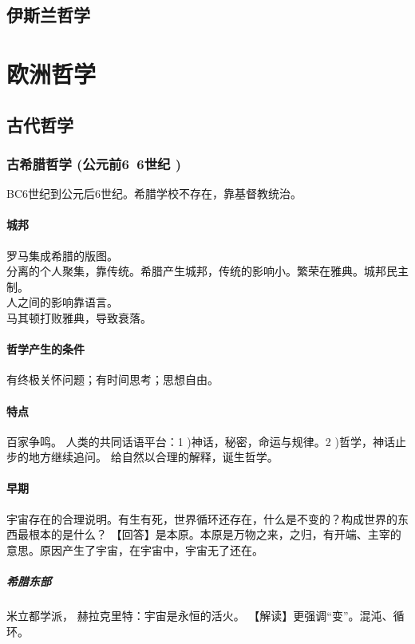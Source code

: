 \documentclass[UTF8]{../RepresentationUniverse}
\begin{document}
\subsection{伊斯兰哲学}




\section{欧洲哲学}
\subsection{古代哲学}
    \subsubsection{古希腊哲学 (公元前6~6世纪 )}
    BC6世纪到公元后6世纪。希腊学校不存在，靠基督教统治。

    \paragraph{城邦}
    罗马集成希腊的版图。\\
    分离的个人聚集，靠传统。希腊产生城邦，传统的影响小。繁荣在雅典。城邦民主制。\\
    人之间的影响靠语言。\\
    马其顿打败雅典，导致衰落。\\


    \paragraph{哲学产生的条件}
    有终极关怀问题；有时间思考；思想自由。

    \paragraph{特点}
    百家争鸣。
    人类的共同话语平台：1 )神话，秘密，命运与规律。2 )哲学，神话止步的地方继续追问。
    给自然以合理的解释，诞生哲学。


    \paragraph{早期}
    宇宙存在的合理说明。有生有死，世界循环还存在，什么是不变的？构成世界的东西最根本的是什么？
    【回答】是本原。本原是万物之来，之归，有开端、主宰的意思。原因产生了宇宙，在宇宙中，宇宙无了还在。


    \subparagraph{希腊东部}
    米立都学派，
    赫拉克里特：宇宙是永恒的活火。
    【解读】更强调“变”。混沌、循环。
\end{document}

